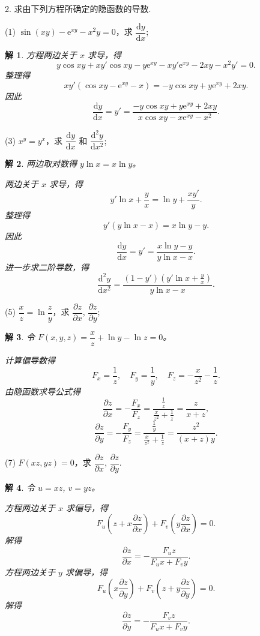 \documentclass[a4paper,12pt]{article}
\newtheorem*{sol}{解}
\begin{document}
2. 求由下列方程所确定的隐函数的导数.

(1) $\sin(xy) - \mathrm{e}^{xy} - x^2y = 0$，求 $\dfrac{\mathrm{d}y}{\mathrm{d}x}$;

\begin{sol}
    方程两边关于 $x$ 求导，得
    $$
        y\cos xy + xy'\cos xy - y\mathrm{e}^{xy} - xy'\mathrm{e}^{xy} - 2xy - x^2y' = 0.
    $$
    整理得
    $$
        xy'(\cos xy - \mathrm{e}^{xy} - x) = -y\cos xy + y\mathrm{e}^{xy} + 2xy.
    $$
    因此
    $$
        \frac{\mathrm{d}y}{\mathrm{d}x} = y' = \frac{-y\cos xy + y\mathrm{e}^{xy} + 2xy}{x\cos xy - x\mathrm{e}^{xy} - x^2}.
    $$
\end{sol}

(3) $x^y = y^x$，求 $\dfrac{\mathrm{d}y}{\mathrm{d}x}$ 和 $\dfrac{\mathrm{d}^2y}{\mathrm{d}x^2}$;

\begin{sol}
    两边取对数得 $y\ln x = x\ln y$。

    两边关于 $x$ 求导，得
    $$
        y'\ln x + \frac{y}{x} = \ln y + \frac{xy'}{y}.
    $$
    整理得
    $$
        y'(y\ln x - x) = x\ln y - y.
    $$
    因此
    $$
        \frac{\mathrm{d}y}{\mathrm{d}x} = y' = \frac{x\ln y - y}{y\ln x - x}.
    $$
    进一步求二阶导数，得
    $$
        \frac{\mathrm{d}^2y}{\mathrm{d}x^2} = \frac{(1 - y')(y'\ln x + \frac{y}{x})}{y\ln x - x}.
    $$
\end{sol}

(5) $\dfrac{x}{z} = \ln\dfrac{z}{y}$，求 $\dfrac{\partial z}{\partial x}$, $\dfrac{\partial z}{\partial y}$;

\begin{sol}
    令 $F(x,y,z) = \dfrac{x}{z} + \ln y - \ln z = 0$。

    计算偏导数得
    $$
        F_x = \frac{1}{z}, \quad F_y = \frac{1}{y}, \quad F_z = -\frac{x}{z^2} - \frac{1}{z}.
    $$
    由隐函数求导公式得
    $$
        \frac{\partial z}{\partial x} = -\frac{F_x}{F_z} = \frac{\frac{1}{z}}{\frac{x}{z^2} + \frac{1}{z}} = \frac{z}{x + z},
    $$
    $$
        \frac{\partial z}{\partial y} = -\frac{F_y}{F_z} = \frac{\frac{1}{y}}{\frac{x}{z^2} + \frac{1}{z}} = \frac{z^2}{(x + z)y}.
    $$
\end{sol}

(7) $F(xz,yz) = 0$，求 $\dfrac{\partial z}{\partial x}$, $\dfrac{\partial z}{\partial y}$.

\begin{sol}
    令 $u = xz$, $v = yz$。

    方程两边关于 $x$ 求偏导，得
    $$
        F_u\left(z + x\frac{\partial z}{\partial x}\right) + F_v\left(y\frac{\partial z}{\partial x}\right) = 0.
    $$
    解得
    $$
        \frac{\partial z}{\partial x} = -\frac{F_u z}{F_u x + F_v y}.
    $$
    方程两边关于 $y$ 求偏导，得
    $$
        F_u\left(x\frac{\partial z}{\partial y}\right) + F_v\left(z + y\frac{\partial z}{\partial y}\right) = 0.
    $$
    解得
    $$
        \frac{\partial z}{\partial y} = -\frac{F_v z}{F_u x + F_v y}.
    $$
\end{sol}
\end{document}
